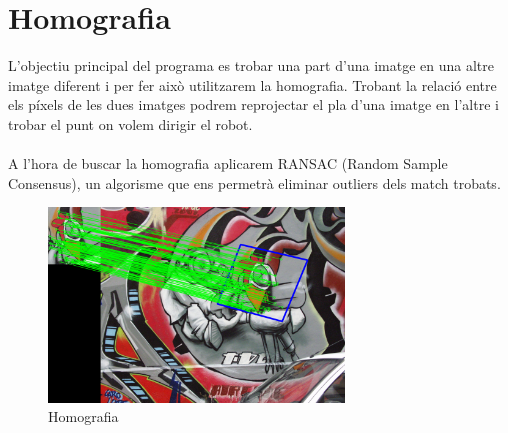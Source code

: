 \newpage
\section{Homografia}

	L'objectiu principal del programa es trobar una part d'una imatge en una altre imatge diferent i per fer això utilitzarem la homografia. Trobant la relació entre els píxels de les dues imatges podrem
	reprojectar el pla d'una imatge en l'altre i trobar el punt on volem dirigir el robot.\\\\
	A l'hora de buscar la homografia aplicarem RANSAC (Random Sample Consensus), un algorisme que ens permetrà eliminar outliers dels match trobats.\\

	\begin{figure}[H]
		\centering
		\includegraphics[width=0.7\textwidth]{images/homography}
		\caption{Homografia}
	\end{figure}
